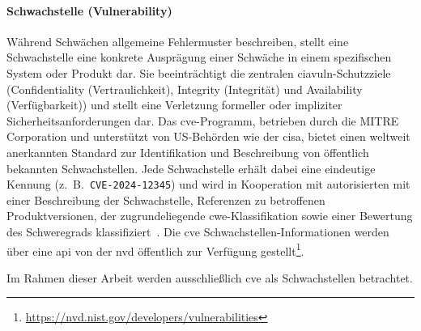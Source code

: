 \paragraph{Schwachstelle (Vulnerability)}

Während Schwächen allgemeine Fehlermuster beschreiben, stellt eine Schwachstelle eine konkrete Ausprägung einer Schwäche in einem spezifischen System oder Produkt dar.
Sie beeinträchtigt die zentralen \acrshort{ciavuln}-Schutzziele (Confidentiality (Vertraulichkeit), Integrity (Integrität) und Availability (Verfügbarkeit)) und stellt eine Verletzung formeller oder impliziter Sicherheitsanforderungen dar.
Das \acrshort{cve}-Programm, betrieben durch die MITRE Corporation und unterstützt von US-Behörden wie der \acrfull{cisa}, bietet einen weltweit anerkannten Standard zur Identifikation und Beschreibung von öffentlich bekannten Schwachstellen.
Jede Schwachstelle erhält dabei eine eindeutige Kennung (z.\ B.\ \verb+CVE-2024-12345+) und wird in Kooperation mit autorisierten  mit einer Beschreibung der Schwachstelle, Referenzen zu betroffenen Produktversionen, der zugrundeliegende \acrshort{cwe}-Klassifikation sowie einer Bewertung des Schweregrads klassifiziert\ \autocite{Ross_Winstead_McEvilley_2022, CveGlossaryCommonVulnerabilitiesAndExposures12mai2025}.
Die \acrshort{cve} Schwachstellen-Informationen werden über eine \acrshort{api} von der \acrshort{nvd} öffentlich zur Verfügung gestellt\footnote{\url{https://nvd.nist.gov/developers/vulnerabilities}}.

Im Rahmen dieser Arbeit werden ausschließlich \acrshort{cve} als Schwachstellen betrachtet.







